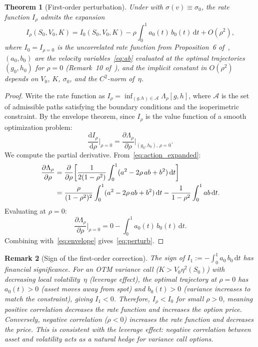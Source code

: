 \documentclass[12pt]{article}
\newtheorem{theorem}{Theorem}[section]
\newtheorem{remark}[theorem]{Remark}
\newcommand{\dd}{\mathrm{d}}
\begin{document}
\begin{theorem}[First-order perturbation]\label{thm:perturb}
Under  with $\sigma(v)\equiv\sigma_0$, the rate function $I_\rho$
admits the expansion
\begin{equation}\label{eq:perturb}
I_\rho(S_0,V_0,K) = I_0(S_0,V_0,K) - \rho\int_0^1 a_0(t)\,b_0(t)\,\dd t
  + O(\rho^2),
\end{equation}
where $I_0 = I_{\rho=0}$ is the uncorrelated rate function from Proposition~6
of~\cite{PWZ2025}, $(a_0,b_0)$ are the velocity variables~\eqref{eq:ab} evaluated
at the optimal trajectories $(g_0,h_0)$ for $\rho=0$ (Remark~10 of~\cite{PWZ2025}),
and the implicit constant in $O(\rho^2)$ depends on $V_0$, $K$, $\sigma_0$, and
the $C^2$-norm of~$\eta$.
\end{theorem}

\begin{proof}
Write the rate function as $I_\rho = \inf_{(g,h)\in\mathcal{A}}\Lambda_\rho[g,h]$,
where $\mathcal{A}$ is the set of admissible paths satisfying the boundary conditions and
the isoperimetric constraint. By the envelope theorem, since $I_\rho$ is the value
function of a smooth optimization problem:
\begin{equation}\label{eq:envelope}
\frac{\dd I_\rho}{\dd\rho}\bigg|_{\rho=0}
  = \frac{\partial\Lambda_\rho}{\partial\rho}\bigg|_{(g_0,h_0),\,\rho=0}.
\end{equation}
We compute the partial derivative. From~\eqref{eq:action_expanded}:
\begin{align}
\frac{\partial\Lambda_\rho}{\partial\rho}
  &= \frac{\partial}{\partial\rho}\biggl[
    \frac{1}{2(1-\rho^2)}\int_0^1(a^2-2\rho\,ab+b^2)\,\dd t\biggr] \notag \\
  &= \frac{\rho}{(1-\rho^2)^2}\int_0^1(a^2-2\rho\,ab+b^2)\,\dd t
   - \frac{1}{1-\rho^2}\int_0^1 ab\,\dd t. \label{eq:dLambda}
\end{align}
Evaluating at $\rho=0$:
\[
\frac{\partial\Lambda_\rho}{\partial\rho}\bigg|_{\rho=0}
  = 0 - \int_0^1 a_0(t)\,b_0(t)\,\dd t.
\]
Combining with~\eqref{eq:envelope} gives~\eqref{eq:perturb}.
\end{proof}

\begin{remark}[Sign of the first-order correction]\label{rem:sign}
The sign of $I_1 := -\int_0^1 a_0\,b_0\,\dd t$ has financial significance. For an OTM
variance call ($K > V_0\eta^2(S_0)$) with decreasing local volatility~$\eta$ (leverage
effect), the optimal trajectory at $\rho=0$ has $a_0(t) > 0$ (asset moves away from spot)
and $b_0(t) > 0$ (variance increases to match the constraint), giving $I_1 < 0$.
Therefore, $I_\rho < I_0$ for small $\rho>0$, meaning positive correlation
\emph{decreases} the rate function and \emph{increases} the option price. Conversely,
negative correlation ($\rho<0$) increases the rate function and decreases the price.
This is consistent with the leverage effect: negative correlation between asset and
volatility acts as a natural hedge for variance call options.
\end{remark}
\end{document}
